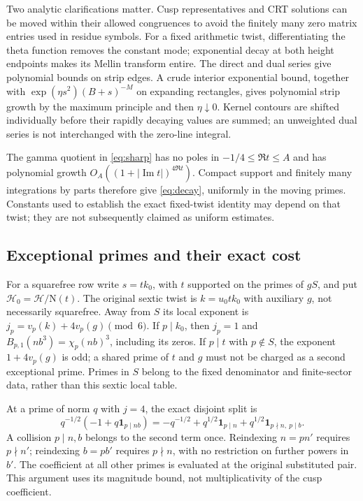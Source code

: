 \documentclass[11pt]{article}
\numberwithin{equation}{section}
\theoremstyle{definition}
\theoremstyle{remark}
\newcommand{\N}{\mathrm N}
\newcommand{\ind}{\mathbf 1}
\begin{document}
Two analytic clarifications matter. Cusp representatives and CRT
solutions can be moved within their allowed congruences to avoid
the finitely many zero matrix entries used in residue symbols.
For a fixed arithmetic twist, differentiating the theta function
removes the constant mode; exponential decay at both height
endpoints makes its Mellin transform entire. The direct and dual
series give polynomial bounds on strip edges. A crude interior
exponential bound, together with
\(\exp(\eta s^2)(B+s)^{-M}\) on expanding rectangles, gives
polynomial strip growth by the maximum principle and then
\(\eta\downarrow0\). Kernel contours are shifted individually before
their rapidly decaying values are summed; an unweighted dual
series is not interchanged with the zero-line integral.

The gamma quotient in \eqref{eq:sharp} has no poles in
\(-1/4\le\Re t\le A\) and has polynomial growth
\(O_A((1+|\operatorname{Im}t|)^{4\Re t})\).
Compact support and finitely many integrations by parts therefore
give \eqref{eq:decay}, uniformly in the moving primes. Constants
used to establish the exact fixed-twist identity may depend on
that twist; they are not subsequently claimed as uniform estimates.

\subsection{Exceptional primes and their exact cost}

For a squarefree row write \(s=tk_0\), with \(t\) supported on
the primes of \(gS\), and put \(\mathcal H_0=\mathcal H/\N(t)\).
The original sextic twist is \(k=u_0tk_0\) with auxiliary \(g\),
not necessarily squarefree. Away from \(S\) its local exponent is
\(j_p=v_p(k)+4v_p(g)\pmod6\).
If \(p\mid k_0\), then \(j_p=1\) and
\(B_{p,1}(nb^3)=\chi_p(nb)^3\), including its zeros.
If \(p\mid t\) with \(p\notin S\), the exponent
\(1+4v_p(g)\) is odd; a shared prime of \(t\) and \(g\)
must not be charged as a second exceptional prime. Primes in
\(S\) belong to the fixed denominator and finite-sector data,
rather than this sextic local table.

At a prime of norm \(q\) with \(j=4\), the exact disjoint split is
\begin{equation}\label{eq:j4}
 q^{-1/2}(-1+q\ind_{p\mid nb})
 =-q^{-1/2}+q^{1/2}\ind_{p\mid n}
                    +q^{1/2}\ind_{p\nmid n,\ p\mid b}.
\end{equation}
A collision \(p\mid n,b\) belongs to the second term once.
Reindexing \(n=pn'\) requires \(p\nmid n'\); reindexing \(b=pb'\)
requires \(p\nmid n\), with no restriction on further powers in
\(b'\). The coefficient at all other primes is evaluated at the
original substituted pair. This argument uses its magnitude bound,
not multiplicativity of the cusp coefficient.
\end{document}
